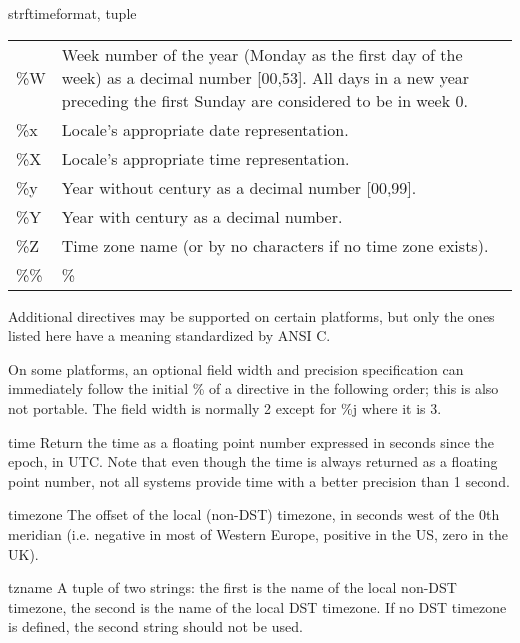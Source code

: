 \begin{funcdesc}{strftime}{format, tuple}
\begin{tabular}{lp{25em}}
           \%W  &      Week number of the year (Monday as the first day of the
                     week) as a decimal number [00,53].  All days in a new
                     year preceding the first Sunday are considered to be in
                     week 0. \\
           \%x  &      Locale's appropriate date representation. \\
           \%X  &      Locale's appropriate time representation. \\
           \%y  &      Year without century as a decimal number [00,99]. \\
           \%Y  &      Year with century as a decimal number. \\
           \%Z  &      Time zone name (or by no characters if no time zone
                     exists). \\
           \%\%  &     \% \\
\end{tabular}

      Additional directives may be supported on certain platforms, but
      only the ones listed here have a meaning standardized by ANSI C.

      On some platforms, an optional field width and precision
      specification can immediately follow the initial \% of a
      directive in the following order; this is also not portable.
      The field width is normally 2 except for \%j where it is 3.

\end{funcdesc}

\begin{funcdesc}{time}{}
Return the time as a floating point number expressed in seconds since
the epoch, in UTC.  Note that even though the time is always returned
as a floating point number, not all systems provide time with a better
precision than 1 second.
\end{funcdesc}

\begin{datadesc}{timezone}
The offset of the local (non-DST) timezone, in seconds west of the 0th
meridian (i.e. negative in most of Western Europe, positive in the US,
zero in the UK).
\end{datadesc}

\begin{datadesc}{tzname}
A tuple of two strings: the first is the name of the local non-DST
timezone, the second is the name of the local DST timezone.  If no DST
timezone is defined, the second string should not be used.
\end{datadesc}

